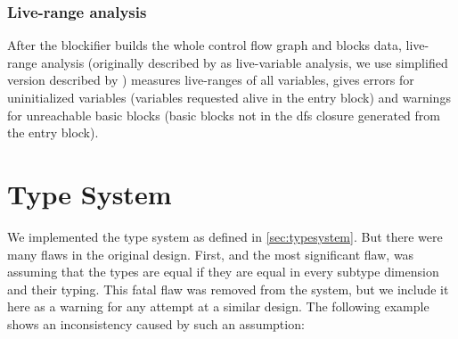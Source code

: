 \subsubsection{Live-range analysis}


After the blockifier builds the whole control flow graph and blocks data, live-range analysis (originally described by \citet{Aho2006compilers} as live-variable analysis, we use simplified version described by \citet{bednarek2008compilers}) measures live-ranges of all variables, gives errors for uninitialized variables (variables requested alive in the entry block) and warnings for unreachable basic blocks (basic blocks not in the dfs closure generated from the entry block).


\section{Type System}

We implemented the type system as defined in \cref{sec:typesystem}. But there were many flaws in the original design. First, and the most significant flaw, was assuming that the types are equal if they are equal in every subtype dimension and their typing. This fatal flaw was removed from the system, but we include it here as a warning for any attempt at a similar design. The following example shows an inconsistency caused by such an assumption:

